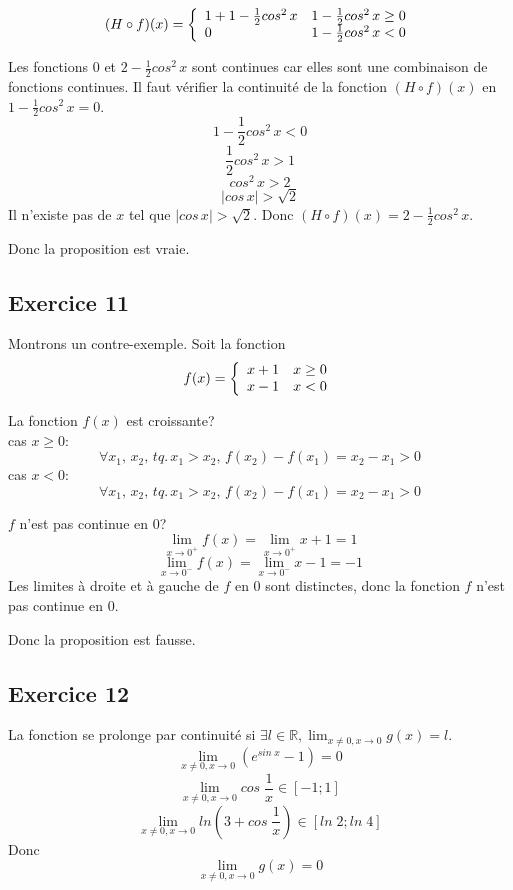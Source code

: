 \documentclass[]{book}
\theoremstyle{definition}
\newcommand{\bb}[1]{\mathbb{#1}}
\newcommand{\R}{\bb{R}}
\begin{document}
$$(H \circ f) (x) = 
\left\{ 
\begin{array}{l l}
 1 + 1 -\frac{1}{2}cos^2\, x & 1 -\frac{1}{2}cos^2\, x \ge 0\\
 0 & 1 -\frac{1}{2}cos^2\, x < 0\\
\end{array}
\right. 
$$

Les fonctions $0$ et $2 -\frac{1}{2}cos^2\, x$ sont continues car elles sont une combinaison de fonctions continues. Il faut v\'erifier la continuit\'e de la fonction $(H \circ f) (x)$ en $1 -\frac{1}{2}cos^2\, x = 0$.
$$1 -\frac{1}{2}cos^2\, x < 0$$
$$\frac{1}{2}cos^2\, x > 1$$
$$cos^2\, x > 2$$
$$|cos\, x| > \sqrt{2}$$
Il n'existe pas de $x$ tel que $|cos\, x| > \sqrt{2}$. Donc $(H \circ f) (x) = 2 -\frac{1}{2}cos^2\, x$.


Donc la proposition est vraie.

\subsection*{Exercice 11}
Montrons un contre-exemple. Soit la fonction 
$$f(x) = 
\left\{ 
\begin{array}{l l}
 x+1 & x \ge 0\\
 x-1 & x < 0\\
\end{array}
\right. 
$$

La fonction $f(x)$ est croissante?\\
cas $x \ge 0$:
$$\forall x_1,\,x_2,\, tq.\, x_1 > x_2,\, f(x_2) - f(x_1) = x_2 - x_1 > 0$$
cas $x < 0$:
$$\forall x_1,\,x_2,\, tq.\, x_1 > x_2,\, f(x_2) - f(x_1) = x_2 - x_1 > 0$$

$f$ n'est pas continue en 0?
$$\lim_{x \to 0^+} f(x) = \lim_{x \to 0^+} x+1 = 1$$
$$\lim_{x \to 0^-} f(x) = \lim_{x \to 0^-} x-1 = -1$$
Les limites \`a droite et \`a gauche de $f$ en $0$ sont distinctes, donc la fonction $f$ n'est pas continue en $0$.


Donc la proposition est fausse.

\subsection*{Exercice 12}
La fonction se prolonge par continuit\'e si $\exists l \in \R, \lim_{x \neq 0, x \to 0} g(x) = l$.
$$\lim_{x \neq 0, x \to 0} (e^{sin\; x}-1) = 0$$
$$\lim_{x \neq 0, x \to 0} cos\; \frac{1}{x} \in [-1;1]$$
$$\lim_{x \neq 0, x \to 0} ln(3+cos\; \frac{1}{x}) \in [ln\; 2; ln\; 4]$$
Donc
$$\lim_{x \neq 0, x \to 0} g(x) = 0$$
\end{document}
